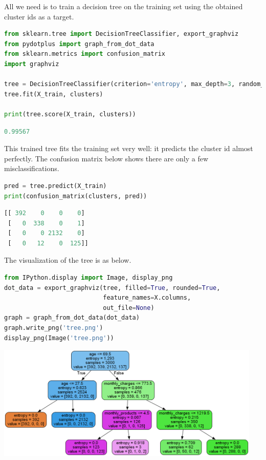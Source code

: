 \documentclass{article}
\begin{document}
All we need is to train a decision tree on the training set using the obtained cluster ids as a target.

\begin{lstlisting}[language=Python]
from sklearn.tree import DecisionTreeClassifier, export_graphviz
from pydotplus import graph_from_dot_data
from sklearn.metrics import confusion_matrix
import graphviz

tree = DecisionTreeClassifier(criterion='entropy', max_depth=3, random_state=1)
tree.fit(X_train, clusters)

print(tree.score(X_train, clusters))
\end{lstlisting}

\begin{lstlisting}[language=Python,numbers=none]
0.99567
\end{lstlisting}

This trained tree fits the training set very well: it predicts the cluster id almost perfectly. The confusion matrix below shows there are only a few misclassifications. 

\begin{lstlisting}[language=Python]
pred = tree.predict(X_train)
print(confusion_matrix(clusters, pred))
\end{lstlisting}

\begin{lstlisting}[language=Python,numbers=none]
[[ 392    0    0    0]
 [   0  338    0    1]
 [   0    0 2132    0]
 [   0   12    0  125]]
\end{lstlisting}

The visualization of the tree is as below.

\begin{lstlisting}[language=Python]
from IPython.display import Image, display_png
dot_data = export_graphviz(tree, filled=True, rounded=True,
                           feature_names=X.columns,
                           out_file=None)
graph = graph_from_dot_data(dot_data)
graph.write_png('tree.png')
display_png(Image('tree.png'))
\end{lstlisting}

\begin{center}
\includegraphics[width=0.95\textwidth]{tree}
\end{center}
\end{document}

